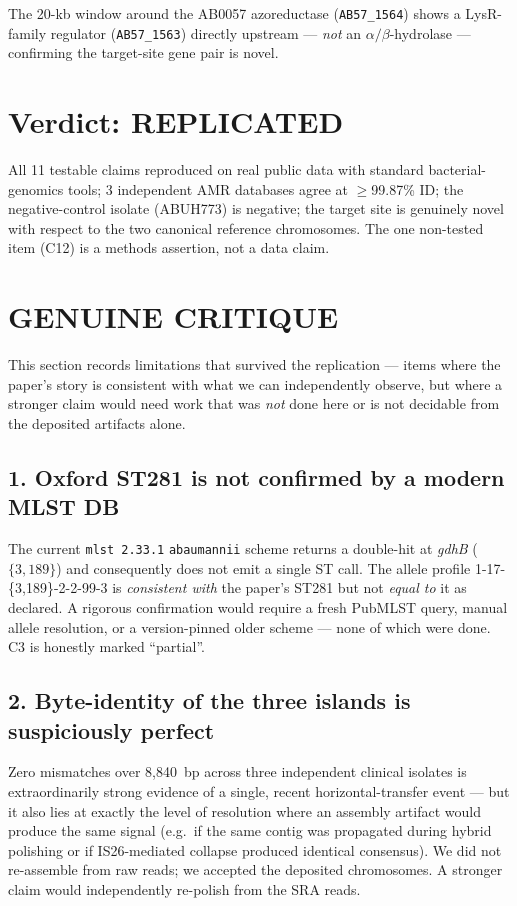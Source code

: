 \documentclass[11pt]{article}
\begin{document}
The 20-kb window around the AB0057 azoreductase (\texttt{AB57\_1564}) shows a LysR-family regulator (\texttt{AB57\_1563}) directly upstream --- \emph{not} an $\alpha/\beta$-hydrolase --- confirming the target-site gene pair is novel.

\section{Verdict: REPLICATED}
All 11 testable claims reproduced on real public data with standard bacterial-genomics tools; 3 independent AMR databases agree at $\geq$99.87\% ID; the negative-control isolate (ABUH773) is negative; the target site is genuinely novel with respect to the two canonical reference chromosomes. The one non-tested item (C12) is a methods assertion, not a data claim.

\section{GENUINE CRITIQUE}

This section records limitations that survived the replication --- items where the paper's story is consistent with what we can independently observe, but where a stronger claim would need work that was \emph{not} done here or is not decidable from the deposited artifacts alone.

\subsection*{1. Oxford ST281 is not confirmed by a modern MLST DB}
The current \texttt{mlst 2.33.1} \texttt{abaumannii} scheme returns a double-hit at \textit{gdhB} ($\{3, 189\}$) and consequently does not emit a single ST call. The allele profile 1-17-\{3,189\}-2-2-99-3 is \emph{consistent with} the paper's ST281 but not \emph{equal to} it as declared. A rigorous confirmation would require a fresh PubMLST query, manual allele resolution, or a version-pinned older scheme --- none of which were done. C3 is honestly marked ``partial''.

\subsection*{2. Byte-identity of the three islands is suspiciously perfect}
Zero mismatches over 8{,}840~bp across three independent clinical isolates is extraordinarily strong evidence of a single, recent horizontal-transfer event --- but it also lies at exactly the level of resolution where an assembly artifact would produce the same signal (e.g.\ if the same contig was propagated during hybrid polishing or if IS26-mediated collapse produced identical consensus). We did not re-assemble from raw reads; we accepted the deposited chromosomes. A stronger claim would independently re-polish from the SRA reads.
\end{document}
